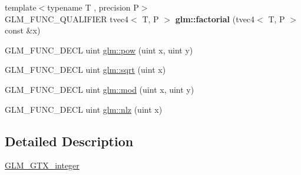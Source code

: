 \begin{DoxyCompactItemize}
\mbox{\label{gtx_2integer_8inl_a521766929c175b805ff9856d23c4e36c}} 
{\footnotesize template$<$typename T , precision P$>$ }\\G\+L\+M\+\_\+\+F\+U\+N\+C\+\_\+\+Q\+U\+A\+L\+I\+F\+I\+ER tvec4$<$ T, P $>$ {\bfseries glm\+::factorial} (tvec4$<$ T, P $>$ const \&x)
\item 
G\+L\+M\+\_\+\+F\+U\+N\+C\+\_\+\+D\+E\+CL uint \hyperlink{group__gtx__integer_gaa8229e850c3cc4ad83492fe390ada044}{glm\+::pow} (uint x, uint y)
\item 
G\+L\+M\+\_\+\+F\+U\+N\+C\+\_\+\+D\+E\+CL uint \hyperlink{group__gtx__integer_ga457e9efca8339bf918d319e9c55f7c8f}{glm\+::sqrt} (uint x)
\item 
G\+L\+M\+\_\+\+F\+U\+N\+C\+\_\+\+D\+E\+CL uint \hyperlink{group__gtx__integer_gab8f9ec0ca93ca90669434224818f0750}{glm\+::mod} (uint x, uint y)
\item 
G\+L\+M\+\_\+\+F\+U\+N\+C\+\_\+\+D\+E\+CL uint \hyperlink{group__gtx__integer_gacbe62fd2384464c16ea30ecc4defc11c}{glm\+::nlz} (uint x)
\end{DoxyCompactItemize}


\subsection{Detailed Description}
\hyperlink{group__gtx__integer}{G\+L\+M\+\_\+\+G\+T\+X\+\_\+integer} 